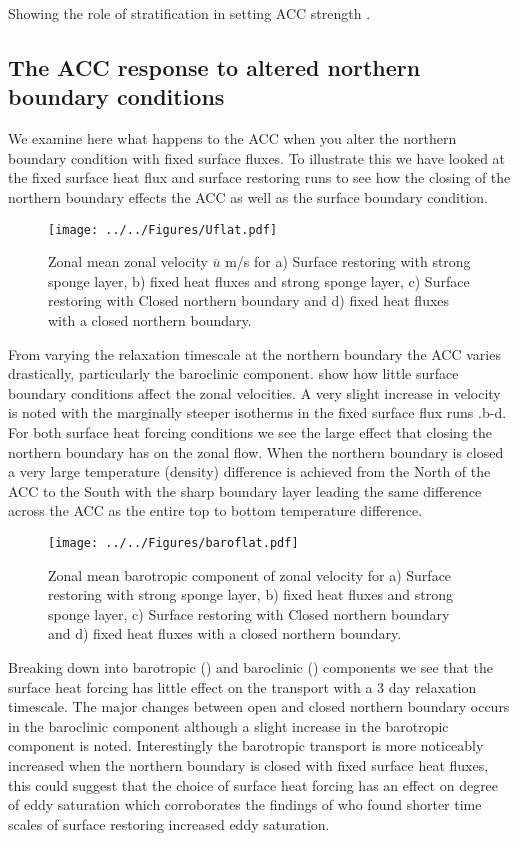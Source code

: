 Showing the role of stratification in setting ACC strength \citep{Hogg2010}. 


\subsection{The ACC response to altered northern boundary conditions}

We examine here what happens to the ACC when you alter the northern boundary condition with fixed surface fluxes. To illustrate this we have looked at the fixed surface heat flux and surface restoring runs to see how the closing of the northern boundary effects the ACC as well as the surface boundary condition. 

\begin{figure}[H]
\noindent \texttt{[image: ../../Figures/Uflat.pdf]} 
\caption{Zonal mean zonal velocity $\overline{u}$ m/s for a) Surface restoring with strong sponge layer, b) fixed heat fluxes and strong sponge layer, c) Surface restoring with Closed northern boundary and d) fixed heat fluxes with a closed northern boundary.}
\label{fig:Uflat}
\end{figure}

From varying the relaxation timescale at the northern boundary the ACC varies drastically, particularly the baroclinic component.  show how little surface boundary conditions affect the zonal velocities. A very slight increase in velocity is noted with the marginally steeper isotherms in the fixed surface flux runs .b-d. For both surface heat forcing conditions we see the large effect that closing the northern boundary has on the zonal flow. When the northern boundary is closed a very large temperature (density) difference is achieved from the North of the ACC to the South with the sharp boundary layer leading the same difference across the ACC as the entire top to bottom temperature difference. 

\begin{figure}[H]
\noindent \texttt{[image: ../../Figures/baroflat.pdf]} 
\caption{Zonal mean barotropic component of zonal velocity for a) Surface restoring with strong sponge layer, b) fixed heat fluxes and strong sponge layer, c) Surface restoring with Closed northern boundary and d) fixed heat fluxes with a closed northern boundary.}
\label{fig:barotroflat}
\end{figure}

Breaking down into barotropic () and baroclinic () components we see that the surface heat forcing has little effect on the transport with a 3 day relaxation timescale. The major changes between open and closed northern boundary occurs in the baroclinic component although a slight increase in the barotropic component is noted. Interestingly the barotropic transport is more noticeably increased when the northern boundary is closed with fixed surface heat fluxes, this could suggest that the choice of surface heat forcing has an effect on degree of eddy saturation which corroborates the findings of \citet{Zhai2014} who found shorter time scales of surface restoring increased eddy saturation. 

